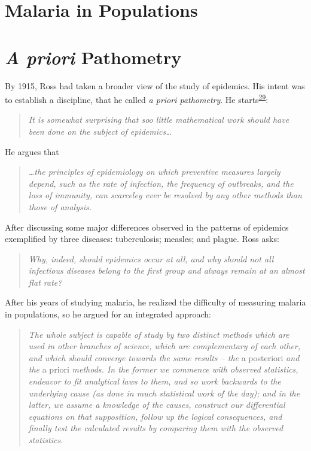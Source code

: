\documentclass[
]{book}
\begin{document}
\hypertarget{malaria-in-populations-1}{%
\section{Malaria in Populations}\label{malaria-in-populations-1}}

\hypertarget{a-priori-pathometry}{%
\section{\texorpdfstring{\emph{A priori} Pathometry}{A priori Pathometry}}\label{a-priori-pathometry}}

By 1915, Ross had taken a broader view of the study of epidemics. His intent was to establish a discipline, that he called \emph{a priori pathometry}. He starts\textsuperscript{\protect\hyperlink{ref-RossR1916ApplicationTheory}{29}}:

\begin{quote}
\emph{It is somewhat surprising that soo little mathematical work should have been done on the subject of epidemics\ldots{}}
\end{quote}

He argues that

\begin{quote}
\emph{\ldots the principles of epidemiology on which preventive measures largely depend, such as the rate of infection, the frequency of outbreaks, and the loss of immunity, can scarceley ever be resolved by any other methods than those of analysis.}
\end{quote}

After discussing some major differences observed in the patterns of epidemics exemplified by three diseases: tuberculosis; measles; and plague. Ross asks:

\begin{quote}
\emph{Why, indeed, should epidemics occur at all, and why should not all infectious diseases belong to the first group and always remain at an almost flat rate?}
\end{quote}

After his years of studying malaria, he realized the difficulty of measuring malaria in populations, so he argued for an integrated approach:

\begin{quote}
\emph{The whole subject is capable of study by two distinct methods which are used in other branches of science, which are complementary of each other, and which should converge towards the same results -- the} a posteriori \emph{and the} a priori \emph{methods. In the former we commence with observed statistics, endeavor to fit analytical laws to them, and so work backwards to the underlying cause (as done in much statistical work of the day); and in the latter, we assume a knowledge of the causes, construct our differential equations on that supposition, follow up the logical consequences, and finally test the calculated results by comparing them with the observed statistics.}
\end{quote}
\end{document}
